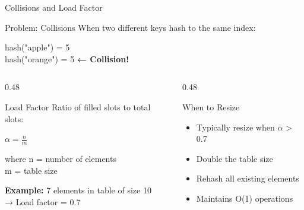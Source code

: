 \documentclass[aspectratio=169,xcolor=dvipsnames]{beamer}
\begin{document}
\begin{frame}{Collisions and Load Factor}
  \begin{alertblock}{Problem: Collisions}
    When two different keys hash to the same index:
    \begin{center}
      hash("apple") = 5 \\
      hash("orange") = 5  \quad \textbf{← Collision!}
    \end{center}
  \end{alertblock}

  \vspace{0.3cm}

  \begin{columns}
    \begin{column}{0.48\textwidth}
      \begin{block}{Load Factor}
        Ratio of filled slots to total slots:
        \begin{center}
          $\alpha = \frac{n}{m}$
        \end{center}
        where n = number of elements \\
        m = table size

        \vspace{0.2cm}

        \textbf{Example:} 7 elements in table of size 10 \\
        → Load factor = 0.7
      \end{block}
    \end{column}
    \begin{column}{0.48\textwidth}
      \begin{block}{When to Resize}
        \begin{itemize}
          \item Typically resize when $\alpha$ > 0.7
          \item Double the table size
          \item Rehash all existing elements
          \item Maintains O(1) operations
        \end{itemize}
      \end{block}
    \end{column}
  \end{columns}
\end{frame}
\end{document}
